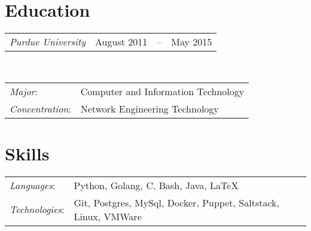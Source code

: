 \documentclass[line,margin]{res}
\begin{document}
  \name{\textcolor{TealBlue}{Ethan Madden}}
  \address{ethan@madden.ninja -- (812) 250-1419}%
  \address{2253A NW 64th St Seattle, WA 98107}

\begin{resume}
  \setlength\tabcolsep{2pt}
  \section{\textcolor{TealBlue}{Education}} 
    \begin{tabular}{@{} p{} r c l @{}}
      {\sl Purdue University\/} & August 2011 & -- & May 2015 %
    \end{tabular}\\
    \begin{tabular}{l l}
      {\sl Major\/}:& Computer and Information Technology \\
      {\sl Concentration\/}:& Network Engineering Technology
    \end{tabular}

  \section{\textcolor{TealBlue}{Skills}} 
    \begin{tabular}{l l}
      {\sl Languages\/}:& Python, Golang, C, Bash, Java, \LaTeX{} \\
      {\sl Technologies\/}:& Git, Postgres, MySql, Docker, Puppet, Saltstack, Linux, VMWare
    \end{tabular}


\end{resume}
\end{document}
